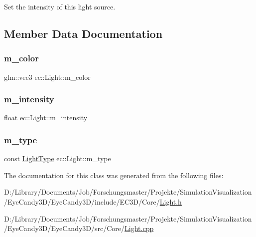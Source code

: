 Set the intensity of this light source. 

\subsection{Member Data Documentation}
\mbox{\label{classec_1_1_light_a7dfc41f1e8f2d7ddad97d60c610c302e}} 
\subsubsection{\texorpdfstring{m\+\_\+color}{m\_color}}
{\footnotesize\ttfamily glm\+::vec3 ec\+::\+Light\+::m\+\_\+color\hspace{0.3cm}{\ttfamily [protected]}}

\mbox{\label{classec_1_1_light_ac655cc4148d5aa4d052bace97770f3b1}} 
\subsubsection{\texorpdfstring{m\+\_\+intensity}{m\_intensity}}
{\footnotesize\ttfamily float ec\+::\+Light\+::m\+\_\+intensity\hspace{0.3cm}{\ttfamily [protected]}}

\mbox{\label{classec_1_1_light_ae3d04075982c6c62e7687b214a504c30}} 
\subsubsection{\texorpdfstring{m\+\_\+type}{m\_type}}
{\footnotesize\ttfamily const \mbox{\hyperlink{namespaceec_a30e2a743ebdeb02ac68a6cfa50f629c7}{Light\+Type}} ec\+::\+Light\+::m\+\_\+type\hspace{0.3cm}{\ttfamily [protected]}}



The documentation for this class was generated from the following files\+:\begin{DoxyCompactItemize}
\item 
D\+:/\+Library/\+Documents/\+Job/\+Forschungsmaster/\+Projekte/\+Simulation\+Visualization/\+Eye\+Candy3\+D/\+Eye\+Candy3\+D/include/\+E\+C3\+D/\+Core/\mbox{\hyperlink{_light_8h}{Light.\+h}}\item 
D\+:/\+Library/\+Documents/\+Job/\+Forschungsmaster/\+Projekte/\+Simulation\+Visualization/\+Eye\+Candy3\+D/\+Eye\+Candy3\+D/src/\+Core/\mbox{\hyperlink{_light_8cpp}{Light.\+cpp}}\end{DoxyCompactItemize}

